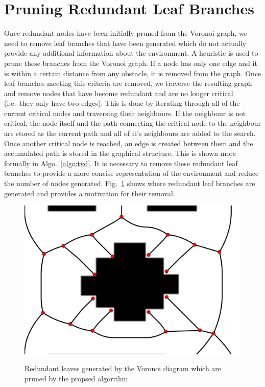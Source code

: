 \documentclass[letterpaper, 10pt, conference]{ieeeconf}
\begin{document}
\section{Pruning Redundant Leaf Branches}

\label{sec:prune_branches}

Once redundant nodes have been initially pruned from the Voronoi graph, we need
to remove leaf branches that have been generated which do not actually provide
any additional information about the environment. A heuristic is used to prune
these branches from the Voronoi graph. If a node has only one edge and it is
within a certain distance from any obstacle, it is removed from the graph. Once
leaf branches meeting this criteria are removed, we traverse the resulting
graph and remove nodes that have become redundant and are no longer critical
(i.e.\ they only have two edges). This is done by iterating through all of the
current critical nodes and traversing their neighbours. If the neighbour is not
critical, the node itself and the path connecting the critical node to the
neighbour are stored as the current path and all of it's neighbours are added
to the search. Once another critical node is reached, an edge is created
between them and the accumulated path is stored in the graphical structure.
This is shown more formally in Algo.~\ref{algo:tvd}. It is necessary to remove
these redundant leaf branches to provide a more concise representation of the
environment and reduce the number of nodes generated.
Fig.~\ref{fig:redundant_leaves} shows where redundant leaf branches are
generated and provides a motivation for their removal.

\begin{figure}[h!]
    \centering
    \includegraphics[width=1\linewidth]{figs/redundant_leaves_strongly_connected}
    \label{fig:redundant_leaves}
    \caption{Redundant leaves generated by the Voronoi diagram which are pruned
        by the propsed algorithm}
\end{figure}
\end{document}
